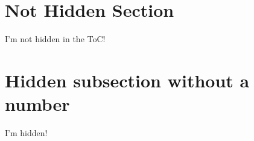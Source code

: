 \section{Not Hidden Section}
I'm not hidden in the ToC! \cite{Albrecht2010}

\section*{Hidden subsection without a number}
I'm hidden! \cite{Albrecht2010_IEICE}

